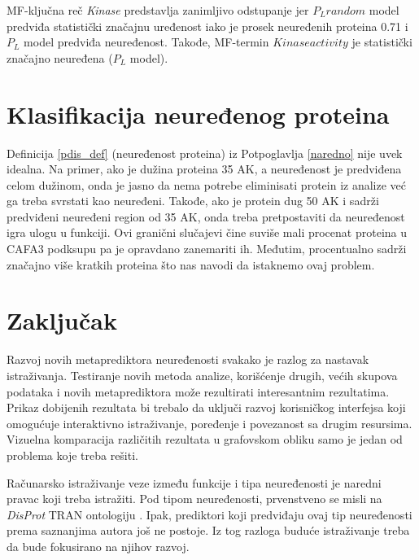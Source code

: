 MF-ključna reč \textit{Kinase} predstavlja zanimljivo odstupanje jer $P_L
random$ model predviđa statistički značajnu uređenost iako je prosek neuređenih
proteina 0.71 i $P_L$ model predviđa neuređenost. Takođe, MF-termin $Kinase
activity$ je statistički značajno neuređena ($P_L$ model).

\section{Klasifikacija neuređenog proteina}

Definicija \ref{pdis_def} (neuređenost proteina) iz Potpoglavlja
\ref{naredno} nije uvek idealna.  Na primer, ako je dužina proteina 35 AK, a
neuređenost je predviđena celom dužinom, onda je jasno da nema potrebe eliminisati
protein iz analize već ga treba svrstati kao neuređeni.  Takođe, ako je protein
dug 50 AK i sadrži predviđeni neuređeni region od 35 AK, onda treba
pretpostaviti da neuređenost igra ulogu u funkciji. Ovi granični slučajevi čine
suviše mali procenat proteina u CAFA3 podksupu pa je opravdano zanemariti ih.
Međutim, procentualno \swissprot sadrži značajno više kratkih proteina što nas
navodi da istaknemo ovaj problem.

\section{Zaključak}

Razvoj novih metaprediktora neuređenosti \cite{Meng_c2017} svakako je razlog za
nastavak istraživanja. Testiranje novih metoda analize, korišćenje drugih,
većih skupova podataka i novih metaprediktora može rezultirati interesantnim
rezultatima. Prikaz dobijenih rezultata bi trebalo da uključi razvoj
korisničkog interfejsa koji omogućuje interaktivno istraživanje, poređenje i
povezanost sa drugim resursima. Vizuelna komparacija različitih rezultata u
grafovskom obliku samo je jedan od problema koje treba rešiti.

Računarsko istraživanje veze između funkcije i tipa neuređenosti je naredni
pravac koji treba istražiti. Pod tipom neuređenosti, prvenstveno se misli na
\textit{DisProt} TRAN ontologiju \cite{Piovesan2016}. Ipak, prediktori koji predviđaju ovaj tip neuređenosti
prema saznanjima autora još ne postoje. Iz tog razloga buduće istraživanje
treba da bude fokusirano na njihov razvoj.

